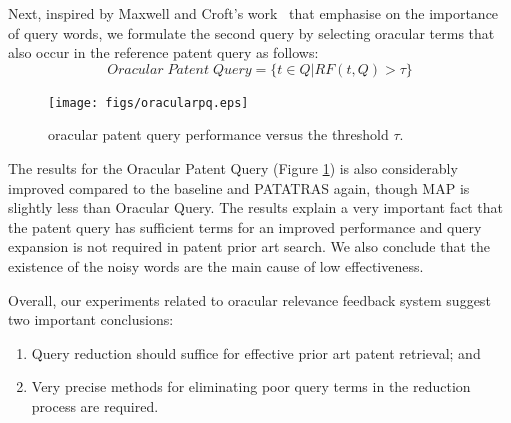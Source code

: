Next, inspired by Maxwell and Croft's work~\citep{maxwell2013compact} that emphasise on the importance of query words, we formulate the second query by selecting oracular terms that also occur in the reference patent query as follows:
\begin{equation}
 Oracular \; Patent \; Query = \{t\in Q|RF(t, Q)>\tau\}   
 \label{eq:score}
\end{equation}
\begin{figure}[t!]
   \centering
   \texttt{[image: figs/oracularpq.eps]}
   \caption{oracular patent query performance versus the threshold $\tau$.}   
   \label{fig:oracularpq} 
\end{figure}
The results for the Oracular Patent Query (Figure \ref{fig:oracularpq}) is also considerably improved compared to the baseline and PATATRAS again, though MAP is slightly less than Oracular Query. The results explain a very important fact that the patent query has sufficient terms for an improved performance and query expansion is not required in patent prior art search. We also conclude that the existence of the noisy words are the main cause of low effectiveness.  

Overall, our experiments related to oracular relevance feedback system
suggest two important conclusions: 
\begin{enumerate}
\item Query reduction should suffice for effective prior art patent retrieval; and 
\item Very precise methods for eliminating poor query terms in the reduction process are required.
\end{enumerate}

%

